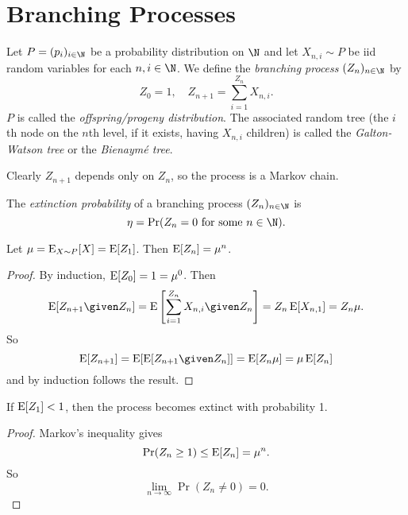 \chapter{Branching Processes} \label{chp:branching}
\begin{definition*} \label{def:branching_process}
    Let $P = (p_i)_{i \in \N}$ be a probability distribution on $\N$ and let
    $X_{n, i} \sim P$ be iid random variables for each $n, i \in \N$.
    We define the \emph{branching process} $(Z_n)_{n \in \N}$ by
    \[
        Z_0 = 1, \quad Z_{n+1} = \sum_{i=1}^{Z_n} X_{n, i}.
    \]
    $P$ is called the \emph{offspring/progeny distribution}.
    The associated random tree (the $i$th node on the $n$th level, if it
    exists, having $X_{n, i}$ children) is called the
    \emph{Galton-Watson tree} or the \emph{Bienaym\'e tree}.
\end{definition*}

Clearly $Z_{n+1}$ depends only on $Z_n$, so the process is a Markov chain.
\begin{definition}[Extinction] \label{def:extinction}
    The \emph{extinction probability} of a branching process
    $(Z_n)_{n \in \N}$ is \[
        \eta = \Pr(Z_n = 0 \text{ for some } n \in \N).
    \]
\end{definition}

\begin{proposition*}[Expectation] \label{thm:expectation}
    Let $\mu = \operatorname{\mathrm{E}}_{X \sim P}[X] = \operatorname{\mathrm{E}}[Z_1]$.
    Then $\operatorname{\mathrm{E}}[Z_n] = \mu^n$.
\end{proposition*}
\begin{proof}
    By induction, $\operatorname{\mathrm{E}}[Z_0] = 1 = \mu^0$.
    Then \[
        \E[Z_{n+1} \given Z_n]
            = \E\left[\sum_{i=1}^{Z_n} X_{n, i} \given Z_n\right]
            = Z_n \E[X_{n, 1}]
            = Z_n \mu.
    \] So \[
        \E[Z_{n+1}]
            = \E[\E[Z_{n+1} \given Z_n]]
            = \E[Z_n \mu]
            = \mu \E[Z_n]
    \] and by induction follows the result.
\end{proof}

\begin{proposition}
    If $\operatorname{\mathrm{E}}[Z_1] < 1$, then the process becomes extinct with probability 1.
\end{proposition}
\begin{proof}
    Markov's inequality gives \[
        \Pr(Z_n \geq 1) \leq \operatorname{\mathrm{E}}[Z_n] = \mu^n.
    \] So \[
        \lim_{n \to \infty} \Pr(Z_n \ne 0) = 0.
    \]
\end{proof}

